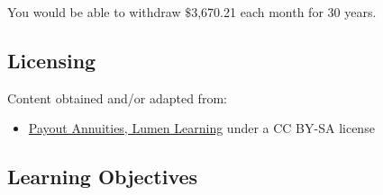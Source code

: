 You would be able to withdraw $\text{\$}$3,670.21 each month for 30 years.




\subsection{Licensing}
\label{sss:lice-7352}




Content obtained and/or adapted from:



\begin{itemize}
    \item \href{https://courses.lumenlearning.com/math4libarts/chapter/payout-annuities/}{Payout Annuities, Lumen Learning} under a CC BY-SA license
\end{itemize}


\subsection{Learning Objectives}
\label{ssec:lear-fe6e}


